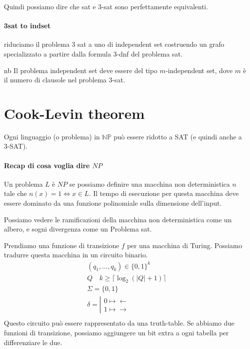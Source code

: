 \documentclass{article}
\begin{document}
Quindi possiamo dire che sat e 3-sat sono perfettamente equivalenti.

\paragraph{3sat to indset} riduciamo il problema 3 sat a uno di independent set costruendo un grafo specializzato a partire dalla formula 3-dnf del problema sat.
\begin{callout}{nb}
    Il problema independent set deve essere del tipo $m$-independent set, dove $m$ è il numero di clausole nel problema 3-sat.
\end{callout}

\section{Cook-Levin theorem}
Ogni linguaggio (o problema) in $\mathbb{NP}$ può essere ridotto a SAT (e quindi anche a 3-SAT).

\paragraph{Recap di cosa voglia dire $NP$} Un problema $L$ è $NP$ se possiamo definire una macchina non deterministica $n$ tale che $n(x)=1\iff x\in L$. Il tempo di esecuzione per questa macchina deve essere dominato da una funzione polinomiale sulla dimensione dell'input.

Possiamo vedere le ramificazioni della macchina non deterministica come un albero, e sogni divergenza come un Problema sat.

Prendiamo una funzione di transizione $f$ per una macchina di Turing. Possiamo tradurre questa macchina in un circuito binario.
\begin{gather*}
    (q_1,\dots,q_k) \in \{0,1\}^k \\
    Q\quad k\geq \lceil \log_2(|Q|+1)\rceil \\
    \Sigma = \{0,1\} \\
    \delta = \left|\begin{array}{c}0\mapsto\leftarrow\\1\mapsto\rightarrow\end{array}\right. \\
\end{gather*}
Questo circuito può essere rappresentato da una truth-table.
Se abbiamo due funzioni di transizione, possiamo aggiungere un bit extra a ogni tabella per differenziare le due.
\end{document}
